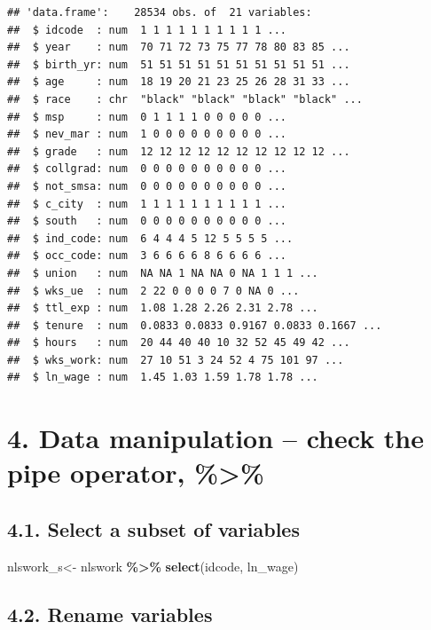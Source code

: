\documentclass[
]{article}
\newenvironment{Shaded}{\begin{snugshade}}{\end{snugshade}}
\newcommand{\FunctionTok}[1]{\textcolor[rgb]{0.13,0.29,0.53}{\textbf{#1}}}
\newcommand{\NormalTok}[1]{#1}
\newcommand{\OtherTok}[1]{\textcolor[rgb]{0.56,0.35,0.01}{#1}}
\newcommand{\SpecialCharTok}[1]{\textcolor[rgb]{0.81,0.36,0.00}{\textbf{#1}}}
\begin{document}
\begin{verbatim}
## 'data.frame':    28534 obs. of  21 variables:
##  $ idcode  : num  1 1 1 1 1 1 1 1 1 1 ...
##  $ year    : num  70 71 72 73 75 77 78 80 83 85 ...
##  $ birth_yr: num  51 51 51 51 51 51 51 51 51 51 ...
##  $ age     : num  18 19 20 21 23 25 26 28 31 33 ...
##  $ race    : chr  "black" "black" "black" "black" ...
##  $ msp     : num  0 1 1 1 1 0 0 0 0 0 ...
##  $ nev_mar : num  1 0 0 0 0 0 0 0 0 0 ...
##  $ grade   : num  12 12 12 12 12 12 12 12 12 12 ...
##  $ collgrad: num  0 0 0 0 0 0 0 0 0 0 ...
##  $ not_smsa: num  0 0 0 0 0 0 0 0 0 0 ...
##  $ c_city  : num  1 1 1 1 1 1 1 1 1 1 ...
##  $ south   : num  0 0 0 0 0 0 0 0 0 0 ...
##  $ ind_code: num  6 4 4 4 5 12 5 5 5 5 ...
##  $ occ_code: num  3 6 6 6 6 8 6 6 6 6 ...
##  $ union   : num  NA NA 1 NA NA 0 NA 1 1 1 ...
##  $ wks_ue  : num  2 22 0 0 0 0 7 0 NA 0 ...
##  $ ttl_exp : num  1.08 1.28 2.26 2.31 2.78 ...
##  $ tenure  : num  0.0833 0.0833 0.9167 0.0833 0.1667 ...
##  $ hours   : num  20 44 40 40 10 32 52 45 49 42 ...
##  $ wks_work: num  27 10 51 3 24 52 4 75 101 97 ...
##  $ ln_wage : num  1.45 1.03 1.59 1.78 1.78 ...
\end{verbatim}

\hypertarget{data-manipulation-check-the-pipe-operator}{%
\section{4. Data manipulation -- check the pipe operator,
\%\textgreater\%}\label{data-manipulation-check-the-pipe-operator}}

\hypertarget{select-a-subset-of-variables}{%
\subsection{4.1. Select a subset of
variables}\label{select-a-subset-of-variables}}

\begin{Shaded}
\begin{Highlighting}[]
\NormalTok{nlswork\_s}\OtherTok{\textless{}{-}}\NormalTok{ nlswork }\SpecialCharTok{\%\textgreater{}\%} 
  \FunctionTok{select}\NormalTok{(idcode, ln\_wage) }
\end{Highlighting}
\end{Shaded}

\hypertarget{rename-variables}{%
\subsection{4.2. Rename variables}\label{rename-variables}}
\end{document}
